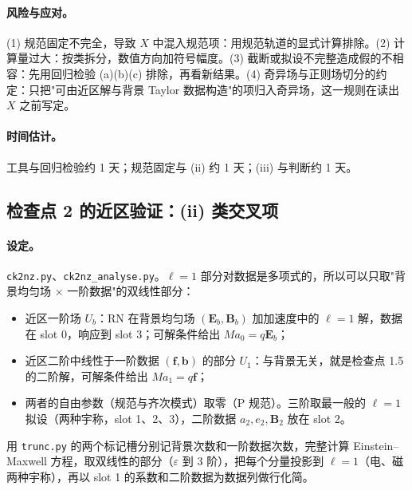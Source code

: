 \documentclass[11pt,a4paper]{ctexart}
\numberwithin{equation}{section}
\begin{document}
\paragraph{风险与应对。}(1) 规范固定不完全，导致 $X$ 中混入规范项：用规范轨道的显式计算排除。(2) 计算量过大：按类拆分，数值方向加符号幅度。(3) 截断或拟设不完整造成假的不相容：先用回归检验 (a)(b)(c) 排除，再看新结果。(4) 奇异场与正则场切分的约定：只把"可由近区解与背景 Taylor 数据构造"的项归入奇异场，这一规则在读出 $X$ 之前写定。

\paragraph{时间估计。}工具与回归检验约 1 天；规范固定与 (ii) 约 1 天；(iii) 与判断约 1 天。

\subsection{检查点 2 的近区验证：(ii) 类交叉项}
\label{sec:L6ck2ii}

\paragraph{设定。}\texttt{ck2nz.py}、\texttt{ck2nz\_analyse.py}。$\ell=1$ 部分对数据是多项式的，所以可以只取"背景均匀场 $\times$ 一阶数据"的双线性部分：
\begin{itemize}
\item 近区一阶场 $U_b$：RN 在背景均匀场 $(\boldsymbol E_b,\boldsymbol B_b)$ 加加速度中的 $\ell=1$ 解，数据在 slot 0，响应到 slot 3；可解条件给出 $Ma_0=q\boldsymbol E_b$；
\item 近区二阶中线性于一阶数据 $(\boldsymbol f,\boldsymbol b)$ 的部分 $U_1$：与背景无关，就是检查点 1.5 的二阶解，可解条件给出 $Ma_1=q\boldsymbol f$；
\item 两者的自由参数（规范与齐次模式）取零（P 规范）。三阶取最一般的 $\ell=1$ 拟设（两种宇称，slot 1、2、3），二阶数据 $a_2,e_2,\boldsymbol B_2$ 放在 slot 2。
\end{itemize}
用 \texttt{trunc.py} 的两个标记槽分别记背景次数和一阶数据次数，完整计算 Einstein--Maxwell 方程，取双线性的部分（$\varepsilon$ 到 3 阶），把每个分量投影到 $\ell=1$（电、磁两种宇称），再以 slot 1 的系数和二阶数据为数据列做行化简。
\end{document}

